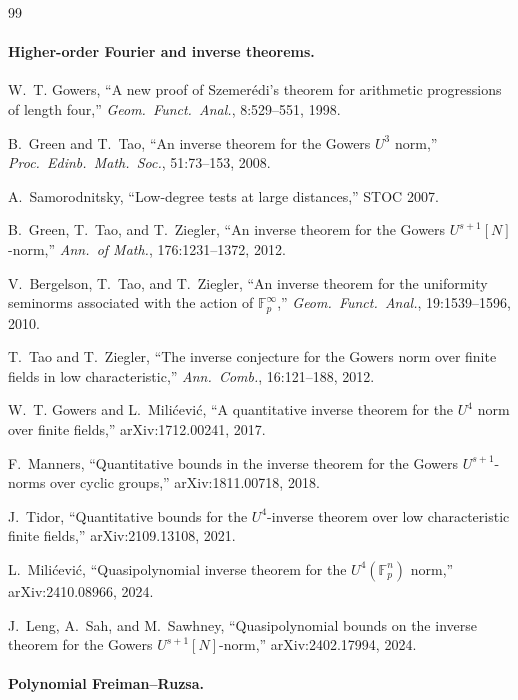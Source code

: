 \documentclass[11pt,a4paper]{article}
\theoremstyle{plain}
\theoremstyle{definition}
\theoremstyle{remark}
\newcommand{\F}{\mathbb{F}}
\begin{document}
\begin{thebibliography}{99}
\paragraph{Higher-order Fourier and inverse theorems.}

W.~T. Gowers, ``A new proof of Szemer\'edi's theorem for arithmetic progressions of length four,'' \emph{Geom.\ Funct.\ Anal.}, 8:529--551, 1998.

B.~Green and T.~Tao, ``An inverse theorem for the Gowers $U^3$ norm,'' \emph{Proc.\ Edinb.\ Math.\ Soc.}, 51:73--153, 2008.

A.~Samorodnitsky, ``Low-degree tests at large distances,'' STOC 2007.

B.~Green, T.~Tao, and T.~Ziegler, ``An inverse theorem for the Gowers $U^{s+1}[N]$-norm,'' \emph{Ann.\ of Math.}, 176:1231--1372, 2012.

V.~Bergelson, T.~Tao, and T.~Ziegler, ``An inverse theorem for the uniformity seminorms associated with the action of $\F_p^\infty$,'' \emph{Geom.\ Funct.\ Anal.}, 19:1539--1596, 2010.

T.~Tao and T.~Ziegler, ``The inverse conjecture for the Gowers norm over finite fields in low characteristic,'' \emph{Ann.\ Comb.}, 16:121--188, 2012.

W.~T. Gowers and L.~Mili\'cevi\'c, ``A quantitative inverse theorem for the $U^4$ norm over finite fields,'' arXiv:1712.00241, 2017.

F.~Manners, ``Quantitative bounds in the inverse theorem for the Gowers $U^{s+1}$-norms over cyclic groups,'' arXiv:1811.00718, 2018.

J.~Tidor, ``Quantitative bounds for the $U^4$-inverse theorem over low characteristic finite fields,'' arXiv:2109.13108, 2021.

L.~Mili\'cevi\'c, ``Quasipolynomial inverse theorem for the $U^4(\F_p^n)$ norm,'' arXiv:2410.08966, 2024.

J.~Leng, A.~Sah, and M.~Sawhney, ``Quasipolynomial bounds on the inverse theorem for the Gowers $U^{s+1}[N]$-norm,'' arXiv:2402.17994, 2024.

\paragraph{Polynomial Freiman--Ruzsa.}


\end{thebibliography}
\end{document}
